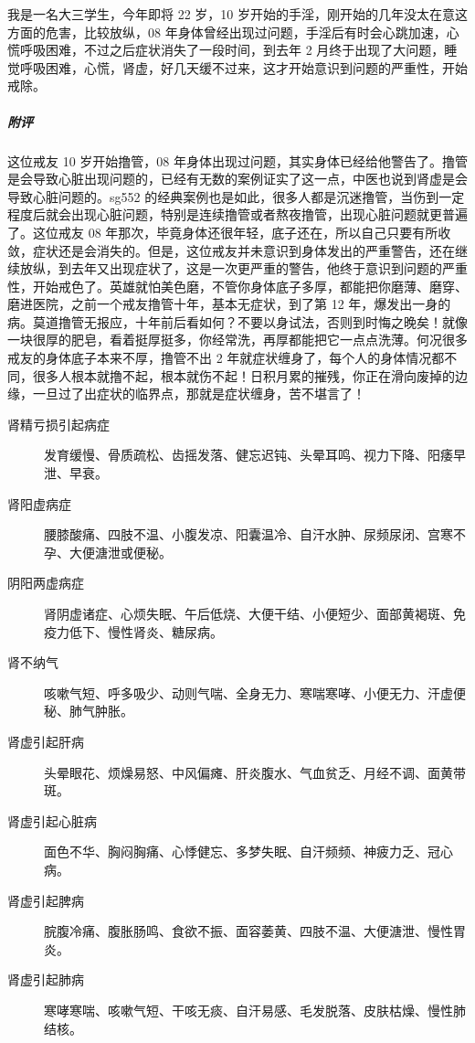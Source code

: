 \begin{case}
    我是一名大三学生，今年即将 22 岁，10 岁开始的手淫，刚开始的几年没太在意这方面的危害，比较放纵，08 年身体曾经出现过问题，手淫后有时会心跳加速，心慌呼吸困难，不过之后症状消失了一段时间，到去年 2 月终于出现了大问题，睡觉呼吸困难，心慌，肾虚，好几天缓不过来，这才开始意识到问题的严重性，开始戒除。
    \subparagraph{附评} 这位戒友 10 岁开始撸管，08 年身体出现过问题，其实身体已经给他警告了。撸管是会导致心脏出现问题的，已经有无数的案例证实了这一点，中医也说到肾虚是会导致心脏问题的。sg552 的经典案例也是如此，很多人都是沉迷撸管，当伤到一定程度后就会出现心脏问题，特别是连续撸管或者熬夜撸管，出现心脏问题就更普遍了。这位戒友 08 年那次，毕竟身体还很年轻，底子还在，所以自己只要有所收敛，症状还是会消失的。但是，这位戒友并未意识到身体发出的严重警告，还在继续放纵，到去年又出现症状了，这是一次更严重的警告，他终于意识到问题的严重性，开始戒色了。英雄就怕美色磨，不管你身体底子多厚，都能把你磨薄、磨穿、磨进医院，之前一个戒友撸管十年，基本无症状，到了第 12 年，爆发出一身的病。莫道撸管无报应，十年前后看如何？不要以身试法，否则到时悔之晚矣！就像一块很厚的肥皂，看着挺厚挺多，你经常洗，再厚都能把它一点点洗薄。何况很多戒友的身体底子本来不厚，撸管不出 2 年就症状缠身了，每个人的身体情况都不同，很多人根本就撸不起，根本就伤不起！日积月累的摧残，你正在滑向废掉的边缘，一旦过了出症状的临界点，那就是症状缠身，苦不堪言了！

    \begin{description}
        \item[肾精亏损引起病症] 发育缓慢、骨质疏松、齿摇发落、健忘迟钝、头晕耳鸣、视力下降、阳痿早泄、早衰。
        \item[肾阳虚病症] 腰膝酸痛、四肢不温、小腹发凉、阳囊温冷、自汗水肿、尿频尿闭、宫寒不孕、大便溏泄或便秘。
        \item[阴阳两虚病症] 肾阴虚诸症、心烦失眠、午后低烧、大便干结、小便短少、面部黄褐斑、免疫力低下、慢性肾炎、糖尿病。
        \item[肾不纳气] 咳嗽气短、呼多吸少、动则气喘、全身无力、寒喘寒哮、小便无力、汗虚便秘、肺气肿胀。
        \item[肾虚引起肝病] 头晕眼花、烦燥易怒、中风偏瘫、肝炎腹水、气血贫乏、月经不调、面黄带斑。
        \item[肾虚引起心脏病] 面色不华、胸闷胸痛、心悸健忘、多梦失眠、自汗频频、神疲力乏、冠心病。
        \item[肾虚引起脾病] 脘腹冷痛、腹胀肠鸣、食欲不振、面容萎黄、四肢不温、大便溏泄、慢性胃炎。
        \item[肾虚引起肺病] 寒哮寒喘、咳嗽气短、干咳无痰、自汗易感、毛发脱落、皮肤枯燥、慢性肺结核。
    \end{description}
\end{case}


